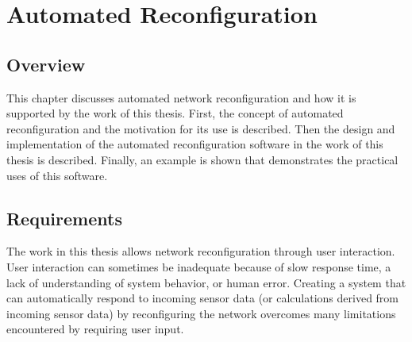 
\chapter{Automated Reconfiguration}
\label{Chapter 6}
\lhead{}

\section{Overview}
This chapter discusses automated network reconfiguration and how it is supported by the work of this thesis. First, the concept of automated reconfiguration and the motivation for its use is described. Then the design and implementation of the automated reconfiguration software in the work of this thesis is described. Finally, an example is shown that demonstrates the practical uses of this software.


\section{Requirements}
The work in this thesis allows network reconfiguration through user interaction. User interaction can sometimes be inadequate because of slow response time, a lack of understanding of system behavior, or human error. Creating a system that can automatically respond to incoming sensor data (or calculations derived from incoming sensor data) by reconfiguring the network overcomes many limitations encountered by requiring user input.


